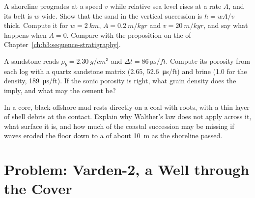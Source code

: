 \begin{exercise}[$\star\star\star$]\label{exo:b3:facies-models:10}
A shoreline progrades at a speed $v$ while relative sea level rises at a rate
$A$, and its  belt is $w$ wide. Show that the  sand in the
vertical succession is $h = wA/v$ thick. Compute it for $w = \qty{2}{km}$,
$A = \qty{0.2}{m/kyr}$ and $v = \qty{20}{m/kyr}$, and say what happens when
$A = 0$. Compare with the proposition on the  of
Chapter~\ref{ch:b3:sequence-stratigraphy}.
\end{exercise}

\begin{exercise}[$\star\star\star$]\label{exo:b3:facies-models:11}
A sandstone reads $\rho_b = \qty{2.30}{g/cm^3}$ and $\Delta t =
\qty{86}{\micro\second/ft}$. Compute its porosity from each log with a quartz
sandstone matrix (2.65, \qty{52.6}{\micro\second/ft}) and brine (1.0 for the
density, \qty{189}{\micro\second/ft}). If the sonic porosity is right, what
grain density does the  imply, and what may the cement be?
\end{exercise}

\begin{exercise}[$\star\star\star$]\label{exo:b3:facies-models:12}
In a core, black offshore mud rests directly on a coal with roots, with a
thin layer of shell debris at the contact. Explain why Walther's law does
not apply across it, what surface it is, and how much of the coastal
succession may be missing if waves eroded the floor down to a  of about \qty{10}{m} as the shoreline passed.
\end{exercise}

\section{Problem: Varden-2, a Well through the Cover}


